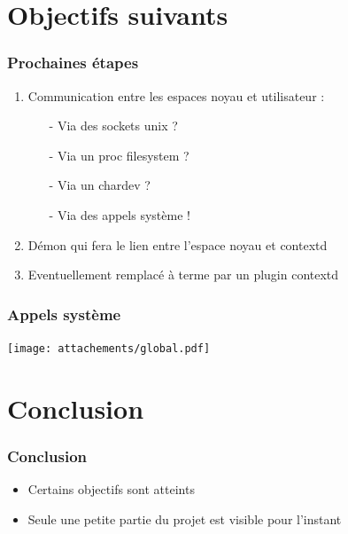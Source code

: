 \documentclass{beamer}
\begin{document}
\section{Objectifs suivants}
\begin{frame}
\frametitle{Prochaines étapes}
\begin{enumerate}
	\item Communication entre les espaces noyau et utilisateur :
	\begin{itemize}
		\item[-] Via des sockets unix ?
		\item[-] Via un proc filesystem ?
		\item[-] Via un chardev ?
		\item[-] Via des appels système !
	\end{itemize}
	\item Démon qui fera le lien entre l'espace noyau et contextd
	\item Eventuellement remplacé à terme par un plugin contextd
\end{enumerate}
\end{frame}

\begin{frame}
\frametitle{Appels système}
\begin{center}
	\texttt{[image: attachements/global.pdf]}
\end{center}
\end{frame}

\section{Conclusion}
\begin{frame}
\frametitle{Conclusion}
\begin{itemize}
	\item Certains objectifs sont atteints
	\item Seule une petite partie du projet est visible pour l'instant
\end{itemize}
\end{frame}
\end{document}
